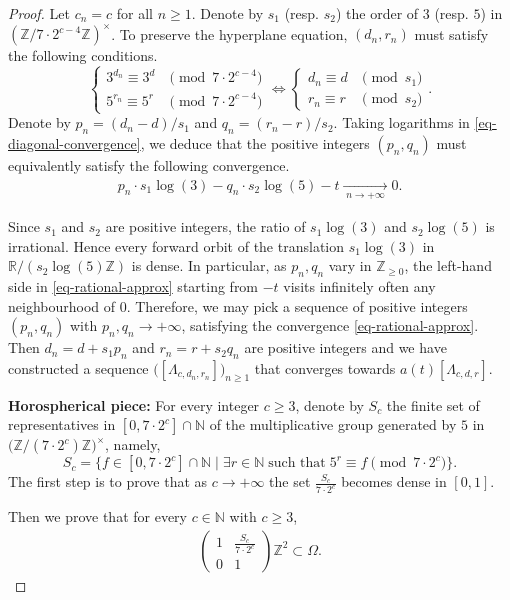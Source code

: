 \documentclass[11pt,letterpaper]{amsart}
\theoremstyle{definition}
\theoremstyle{remark}
\newcommand{\bb}[1]{\mathbb{#1}}
\newcommand{\R}{\bb R}
\newcommand{\Z}{\bb Z}
\newcommand{\N}{\bb N}
\begin{document}
\begin{proof}
Let $c_n = c$ for all $n\geq 1$. 
Denote by $s_1$ (resp. $s_2$) the order of $3$ (resp. $5$) in $(\Z/7 \cdot 2^{c-4}\Z)^\times$.
To preserve the hyperplane equation, $(d_n,r_n)$ must satisfy the following conditions. 
	$$\left\lbrace
	\begin{array}{cr}
	3^{d_n} \equiv 3^d &\pmod{ 7 \cdot 2^{c-4}}\\
	5^{r_n} \equiv 5^{r} &\pmod{ 7 \cdot 2^{c-4} }
	\end{array}
	\right. \Longleftrightarrow 
	\left\lbrace
	\begin{array}{cr}
	d_n \equiv d &\pmod{s_1}\\
	r_n \equiv r &\pmod{s_2}
	\end{array}
	\right. .$$		
Denote by $p_n = (d_n -d)/s_1$ and $q_n = (r_n-r)/s_2$.
Taking logarithms in \eqref{eq-diagonal-convergence}, we deduce that the positive integers $(p_n,q_n)$ must equivalently satisfy the following convergence.
\begin{eqnarray}\label{eq-rational-approx}
p_n \cdot s_1\log(3) - q_n \cdot s_2 \log(5) - t \xrightarrow[\; n \rightarrow +\infty \;]{}  0.
\end{eqnarray}

Since $s_1$ and $s_2$ are positive integers, the ratio of $s_1 \log(3)$ and $s_2 \log(5)$ is irrational.
Hence every forward orbit of the translation $s_1 \log(3)$ in $\R/( s_2 \log(5)\Z) $ is dense. In particular, as $p_n,q_n$ vary in $\Z_{
\geq 0 }$, the left-hand side in \eqref{eq-rational-approx} starting from $-t$ visits infinitely often any neighbourhood of $0$.
Therefore, we may pick a sequence of positive integers $(p_n,q_n)$ with $p_n, q_n \rightarrow + \infty$, satisfying the convergence \eqref{eq-rational-approx}.
Then $d_n = d + s_1 p_n$ and $r_n = r+s_2  q_n$ are positive integers and we have constructed a sequence $\big([\Lambda_{c,d_n,r_n}]\big)_{n\geq 1}$ that converges towards $a(t)[\Lambda_{c,d,r}]$. 


\textbf{Horospherical piece:}
For every integer $c\geq 3$, denote by $S_c$ the finite set of representatives in $[0,7\cdot 2^c]\cap \N$ of the multiplicative group generated by $5$ in $\big(\Z /(7 \cdot 2^c)\Z\big)^\times$, namely,	
$$S_c = \Big\lbrace f \in [0,7 \cdot 2^c]\cap \N \; \Big\vert \; \exists r \in \N \; \text{such that} \; 5^r \equiv f \pmod{7 \cdot 2^c} \Big\rbrace. $$ 		
The first step is to prove that as $c \rightarrow +\infty$ the set $\frac{S_c}{7 \cdot 2^c}$ becomes dense in $[0,1]$.

Then we prove that for every $c\in\N$ with $c\geq 3$,
\begin{eqnarray}\label{eq-horos-inclusion}
\begin{pmatrix}
1 & \frac{S_c}{7 \cdot 2^c} \\
0 & 1
\end{pmatrix} \Z^2 \subset \Omega.
\end{eqnarray}
 

\end{proof}
\end{document}
